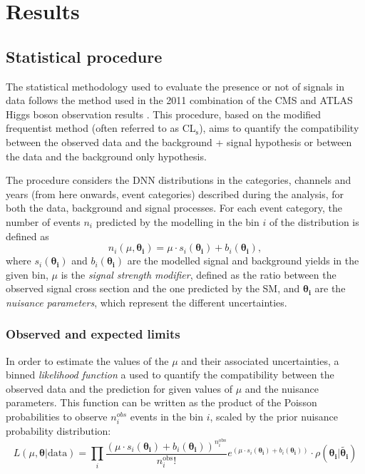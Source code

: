 \documentclass[../main.tex]{subfiles}
\begin{document}
\chapter{Results}


\section{Statistical procedure}

The statistical methodology used to evaluate the presence or not of signals in data follows the method used in the 2011 combination of the CMS and ATLAS Higgs boson observation results \cite{hh:results:statistical_model}. This procedure, based on the modified frequentist method (often referred to as CL${}_\text{s}$), aims to quantify the compatibility between the observed data and the background + signal hypothesis or between the data and the background only hypothesis. 

The procedure considers the DNN distributions in the categories, channels and years (from here onwards, event categories) described during the analysis, for both the data, background and signal processes. For each event category, the number of events $n_i$ predicted by the modelling in the bin $i$ of the distribution is defined as
\begin{equation}
n_i(\mu, \boldsymbol{\theta_i})=\mu\cdot s_i (\boldsymbol{\theta_i}) + b_i(\boldsymbol{\theta_i}),
\end{equation}
where $s_i (\boldsymbol{\theta_i})$ and $b_i(\boldsymbol{\theta_i})$ are the modelled signal and background yields in the given bin, $\mu$ is the \textit{signal strength modifier}, defined as the ratio between the observed signal cross section and the one predicted by the SM, and $\boldsymbol{\theta_i}$ are the \textit{nuisance parameters}, which represent the different uncertainties.

\subsection{Observed and expected limits}

In order to estimate the values of the $\mu$ and their associated uncertainties, a binned \textit{likelihood function} a used to quantify the compatibility between the observed data and the prediction for given values of $\mu$ and the nuisance parameters. This function can be written as the product of the Poisson probabilities to observe $n_i^{obs}$ events in the bin $i$, scaled by the prior nuisance probability distribution:
\begin{equation}
L(\mu, \boldsymbol{\theta} | \text{data}) = \prod_i \frac{\left(\mu\cdot s_i (\boldsymbol{\theta_i}) + b_i(\boldsymbol{\theta_i}) \right)^{n_i^\text{obs}}}{n_i^\text{obs}!}e^{(\mu\cdot s_i (\boldsymbol{\theta_i}) + b_i(\boldsymbol{\theta_i}))} \cdot \rho(\boldsymbol{\theta_i}|\boldsymbol{\tilde{\theta_i}})
\end{equation}
\end{document}
